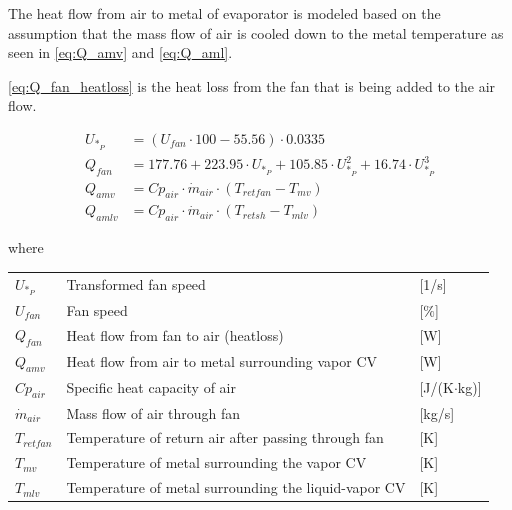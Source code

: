 \medskip
The heat flow from air to metal of evaporator is modeled based on the assumption that the mass flow of air is cooled down to the metal temperature as seen in \cref{eq:Q_amv} and \cref{eq:Q_aml}.

\cref{eq:Q_fan_heatloss} is the heat loss from the fan that is being added to the air flow.

\begin{align}
	U_{*_P} & = \left( U_{fan}\cdot 100 - 55.56 \right) \cdot 0.0335                                         \\
	Q_{fan} & = 177.76 + 223.95 \cdot U_{*_P} + 105.85 \cdot U_{*_P}^2 + 16.74 \cdot U_{*_P}^3	\label{eq:Q_fan_heatloss} \\
	Q_{amv} & = Cp_{air} \cdot \dot{m}_{air} \cdot (T_{retfan} - T_{mv}) 	\label{eq:Q_amv}                                \\
	Q_{amlv} & = Cp_{air} \cdot \dot{m}_{air} \cdot (T_{retsh} - T_{mlv}) 	\label{eq:Q_aml}
\end{align}

where

\begin{center}
	\begin{tabular}{l p{10cm} l}
		$U_{*_P}$       & Transformed fan speed                                & [1/\si{s}]                        \\
		$U_{fan}$       & Fan speed                                            & [$\%$]                        \\
		$Q_{fan}$       & Heat flow from fan to air (heatloss)                 & [\si{W}]                          \\
		$Q_{amv}$       & Heat flow from air to metal surrounding vapor CV     & [\si{W}]                          \\
		$Cp_{air}$      & Specific heat capacity of air                        & [\si{J}/(\si{K}$ \cdot $\si{kg})] \\
		$\dot{m}_{air}$ & Mass flow of air through fan                         & [\si{kg}/\si{s}]                  \\
		$T_{retfan}$    & Temperature of return air after passing through fan  & [\si{K}]                          \\
		$T_{mv}$        & Temperature of metal surrounding the vapor CV        & [\si{K}]                          \\
		$T_{mlv}$       & Temperature of metal surrounding the liquid-vapor CV & [\si{K}]
	\end{tabular}
\end{center}

